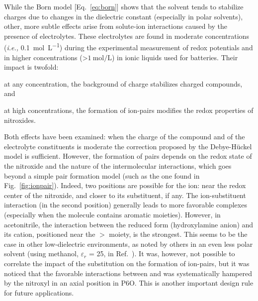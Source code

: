 \documentclass[review,preprint]{elsarticle}
\begin{document}
While the Born model [Eq.~\eqref{eq:born}] shows that the solvent tends to stabilize charges due to changes in the dielectric constant (especially in polar solvents), other, more subtle effects arise from solute-ion interactions caused by the presence of electrolytes. These electrolytes are found in moderate concentrations (\textit{i.e.,} \SI{0.1}{\mole\per\liter}) during the experimental measurement of redox potentials and in higher concentrations (>$\SI{1}{\mole\per\liter}$) in ionic liquids used for batteries. 
Their  impact is twofold:
\begin{inparaenum}[(i)]
	\item at any concentration, the background of charge stabilizes charged compounds, and
	\item at high concentrations, the formation of ion-pairs modifies the redox properties of nitroxides.
\end{inparaenum}
Both effects have been examined: when the charge of the compound and of the electrolyte constituents is moderate  the correction proposed by the Debye-Hückel model is sufficient. However, the formation of pairs depends on the redox state of the nitroxide and the nature of the intermolecular interactions, which goes beyond a simple pair formation model (such as the one found in Fig.~\ref{fig:ionpair}). Indeed, two positions are possible for the ion: near the redox center of the nitroxide, and closer to its substituent, if any. The ion-substituent interaction (in the second position) generally leads to more favorable complexes (especially when the molecule contains aromatic moieties). However, in acetonitrile, the interaction between the reduced form (hydroxylamine anion) and its cation, positioned near the $>$ moiety, is the strongest. This seems to be the case in other low-dielectric environments, as noted by others in an even less polar solvent (using methanol, $\varepsilon_r$ = 25, in Ref.~).
It was, however, not possible to correlate the impact of the substitution on the formation of ion-pairs, but it was noticed that the favorable interactions between  and  was systematically hampered by the nitroxyl in an axial position in P6O. This is another important design rule for future applications.
\end{document}
